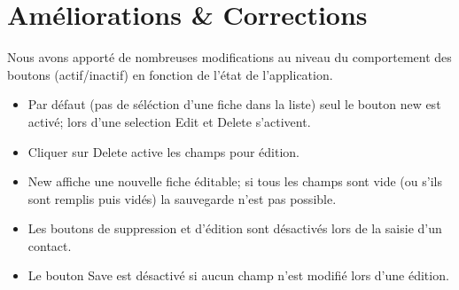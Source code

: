 \documentclass{article}
\begin{document}
\section{Améliorations \& Corrections}
Nous avons apporté de nombreuses modifications au niveau du comportement des boutons (actif/inactif) en fonction de l'état de l'application.
\begin{itemize}
\item Par défaut (pas de séléction d'une fiche dans la liste) seul le bouton new est activé; lors d'une selection Edit et Delete s'activent.
\item Cliquer sur Delete active les champs pour édition.
\item New affiche une nouvelle fiche éditable; si tous les champs sont vide (ou s'ils sont remplis puis vidés) la sauvegarde n'est pas possible. 
\item Les boutons de suppression et d'édition sont désactivés lors de la saisie d'un contact.
\item Le bouton Save est désactivé si aucun champ n'est modifié lors d'une édition.
\end{itemize}
\newpage
\end{document}
